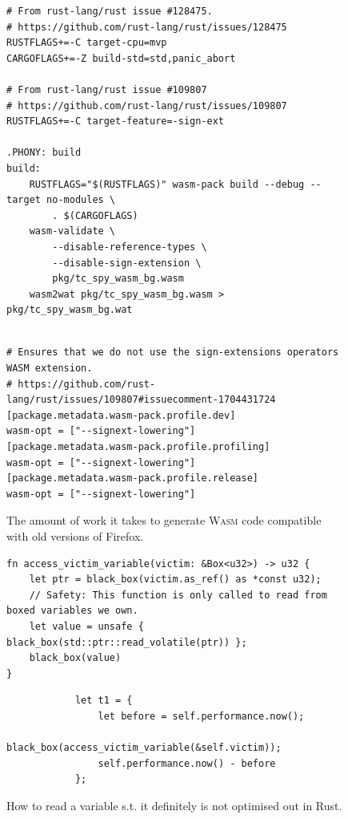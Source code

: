 \documentclass[a4paper,10pt,twocolumn]{article}
\theoremstyle{definition}
\newcommand*{\acronym}{\textsc}
\newcommand*{\WASM}{\acronym{Wasm}}
\begin{document}
\begin{figure}[h]
\begin{verbatim}
# From rust-lang/rust issue #128475.
# https://github.com/rust-lang/rust/issues/128475
RUSTFLAGS+=-C target-cpu=mvp
CARGOFLAGS+=-Z build-std=std,panic_abort

# From rust-lang/rust issue #109807
# https://github.com/rust-lang/rust/issues/109807
RUSTFLAGS+=-C target-feature=-sign-ext

.PHONY: build
build:
	RUSTFLAGS="$(RUSTFLAGS)" wasm-pack build --debug --target no-modules \
		. $(CARGOFLAGS)
	wasm-validate \
		--disable-reference-types \
		--disable-sign-extension \
		pkg/tc_spy_wasm_bg.wasm
	wasm2wat pkg/tc_spy_wasm_bg.wasm > pkg/tc_spy_wasm_bg.wat
\end{verbatim}
  \begin{verbatim}

# Ensures that we do not use the sign-extensions operators WASM extension.
# https://github.com/rust-lang/rust/issues/109807#issuecomment-1704431724
[package.metadata.wasm-pack.profile.dev]
wasm-opt = ["--signext-lowering"]
[package.metadata.wasm-pack.profile.profiling]
wasm-opt = ["--signext-lowering"]
[package.metadata.wasm-pack.profile.release]
wasm-opt = ["--signext-lowering"]
\end{verbatim}
  \caption{The amount of work it takes to generate \WASM{} code compatible with
    old versions of Firefox.}
\end{figure}

\begin{figure}[h]
\begin{verbatim}
fn access_victim_variable(victim: &Box<u32>) -> u32 {
    let ptr = black_box(victim.as_ref() as *const u32);
    // Safety: This function is only called to read from boxed variables we own.
    let value = unsafe { black_box(std::ptr::read_volatile(ptr)) };
    black_box(value)
}
\end{verbatim}

  \begin{verbatim}
            let t1 = {
                let before = self.performance.now();
                black_box(access_victim_variable(&self.victim));
                self.performance.now() - before
            };
\end{verbatim}
  \caption{How to read a variable s.t. it definitely is not optimised out in Rust.}
\end{figure}
\end{document}
